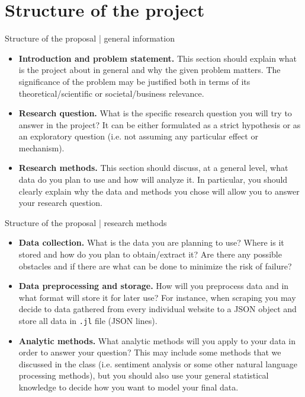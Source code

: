 \documentclass{beamer}
\begin{document}
\section[Structure of the project]{Structure of the project}
\begin{frame}{Structure of the proposal | general information}
    \begin{itemize}
     \item \textbf{Introduction and problem statement.} This section should
     explain what is the project about in general and why the given problem
     matters. The significance of the problem may be justified both in terms of
     its theoretical/scientific or societal/business relevance.
     \item \textbf{Research question.} What is the specific research question
     you will try to answer in the project? It can be either formulated as a
     strict hypothesis or as an exploratory question (i.e. not assuming any
     particular effect or mechanism).
     \item \textbf{Research methods.} This section should discuss, at a general
     level, what data do you plan to use and how will analyze it. In particular,
     you should clearly explain why the data and methods you chose will allow
     you to answer your research question.
    \end{itemize}
\end{frame}
    
\begin{frame}{Structure of the proposal | research methods}
    \begin{itemize}
     \item \textbf{Data collection.} What is the data you are planning to use?
     Where is it stored and how do you plan to obtain/extract it?  Are there any
     possible obstacles and if there are what can be done to minimize the risk
     of failure?
     \item \textbf{Data preprocessing and storage.} How will you preprocess data
     and in what format will store it for later use? For instance, when scraping
     you may decide to data gathered from every individual website to a JSON
     object and store all data in \texttt{.jl} file (JSON lines).
     \item \textbf{Analytic methods.} What analytic methods will you apply to
     your data in order to answer your question? This may include some methods
     that we discussed in the class (i.e. sentiment analysis or some other
     natural language processing methods), but you should also use your general
     statistical knowledge to decide how you want to model your final data.
    \end{itemize}
\end{frame}
    
\end{document}
